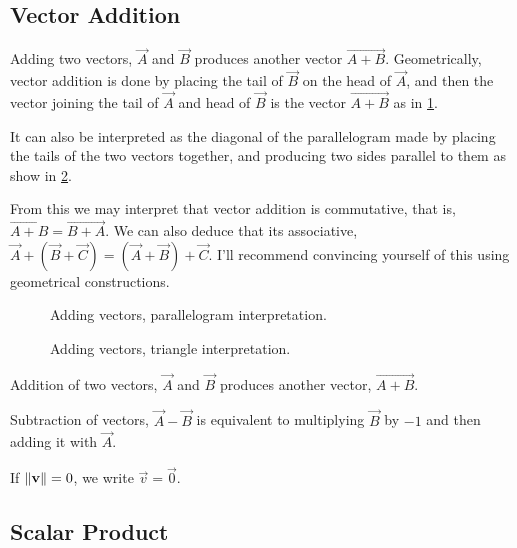 \subsection{Vector Addition}

Adding two vectors, \(\vec{A}\) and \(\vec{B}\) produces another 
vector \(\vec{A + B}\). Geometrically, vector addition is done by placing
the tail of \(\vec{B}\) on the head of \(\vec{A}\), and then the vector joining
the tail of \(\vec{A}\) and head of \(\vec{B}\) is the vector \(\vec{A + B}\) as 
in \cref{subfig: vectoradd1}.

It can also be interpreted as the diagonal of the parallelogram made by placing
the tails of the two vectors together, and producing two sides parallel to them as 
show in \cref{subfig: vectoradd2}. 

From this we may interpret that vector addition is commutative, that is, 
\(\vec{A + B} = \vec{B + A}\). We can also deduce that its associative,
\(\vec{A} + (\vec{B} + \vec{C}) = (\vec{A} + \vec{B}) + \vec{C}\). I'll 
recommend convincing yourself of this using geometrical constructions.

\begin{marginfigure}
  \centering
  \begin{subfigure}[t]{\marginparwidth}
  \caption{Adding vectors, parallelogram interpretation.}
  \label{subfig: vectoradd1}
  \end{subfigure}
  \begin{subfigure}[t]{\marginparwidth}
  \caption{Adding vectors, triangle interpretation.}
  \label{subfig: vectoradd2}
  \end{subfigure}
  \caption{Addition of two vectors, \(\vec{A}\) and \(\vec{B}\) produces another
  vector, \(\vec{A + B}\).}
\end{marginfigure}

Subtraction of vectors, \(\vec{A} - \vec{B}\) is equivalent to multiplying \(\vec{B}\) 
by \(-1\) and then adding it with \(\vec{A}\).

If \(\norm{\mathbf{\boldsymbol{v}}} = 0\), we write \(\vec{v} = \vec{0}\). 

\subsection{Scalar Product}